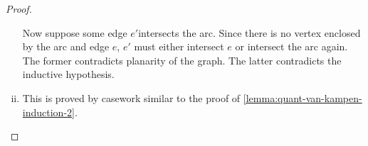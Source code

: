 \begin{proof}
\begin{enumerate}[(i)]
		Now suppose some edge $e'$intersects the arc. Since there is no vertex enclosed by the arc and edge $e$, $e'$ must either intersect $e$ or intersect the arc again. The former contradicts planarity of the graph. The latter contradicts the inductive hypothesis.
		\item 




		This is proved by casework similar to the proof of \eqref{lemma:quant-van-kampen-induction-2}.
	\end{enumerate}
\end{proof}

